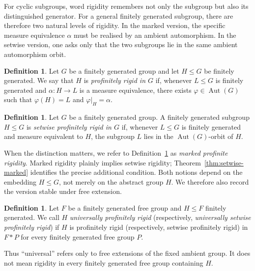\documentclass[11pt]{amsart}
\theoremstyle{plain}
\theoremstyle{definition}
\newtheorem{definition}[theorem]{Definition}
\newcommand{\Aut}{\operatorname{Aut}}
\begin{document}
For cyclic subgroups, word rigidity remembers not only the subgroup but also its
distinguished generator. For a general finitely generated subgroup, there are
therefore two natural levels of rigidity. In the marked version, the specific
measure equivalence $\alpha$ must be realised by an ambient automorphism. In
the setwise version, one asks only that the two subgroups lie in the same
ambient automorphism orbit.
\begin{definition}\label{def:rigid}
Let $G$ be a finitely generated group and let $H\le G$ be finitely generated.
We say that $H$ is \emph{profinitely rigid in $G$} if, whenever $L\le G$ is
finitely generated and $\alpha\colon H\to L$ is a measure equivalence, there
exists $\varphi\in\Aut(G)$ such that
$\varphi(H)=L$ and $\varphi|_H=\alpha$.
\end{definition}
\begin{definition}\label{def:setwise}
Let $G$ be a finitely generated group.  A finitely generated subgroup $H\le G$ is
\emph{setwise profinitely rigid in $G$} if, whenever $L\le G$ is finitely
generated and measure equivalent to $H$, the subgroup $L$ lies in the
$\Aut(G)$-orbit of $H$.
\end{definition}
When the distinction matters, we refer to Definition~\ref{def:rigid} as
\emph{marked profinite rigidity}. Marked rigidity plainly implies setwise
rigidity; Theorem~\ref{thm:setwise-marked} identifies the precise additional
condition. Both notions depend on the embedding $H\le G$, not merely on the
abstract group $H$. We therefore also record the version stable under free
extension.
\begin{definition}\label{def:universal-rigid}
Let $F$ be a finitely generated free group and $H\le F$ finitely generated. We
call $H$ \emph{universally profinitely rigid} (respectively, \emph{universally
setwise profinitely rigid}) if $H$ is profinitely rigid (respectively, setwise
profinitely rigid) in $F*P$ for every finitely generated free group $P$.
\end{definition}
Thus ``universal'' refers only to free extensions of the fixed ambient group.
It does not mean rigidity in every finitely generated free group containing
$H$.
\end{document}
